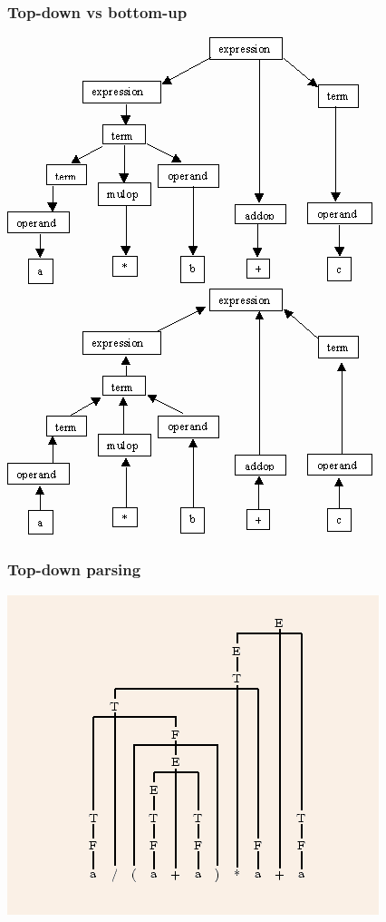 \documentclass{beamer}
\begin{document}
\begin{frame}
  \frametitle{Top-down vs bottom-up}
  \begin{center}
    \includegraphics[scale=0.3]{topdown}
\hfill
    \includegraphics[scale=0.3]{bottomup}
  \end{center}
\end{frame}

\begin{frame}
  \frametitle{Top-down parsing}
  \begin{center}
    \includegraphics[scale=0.3]{topdown2}
  \end{center}
\end{frame}
\end{document}

